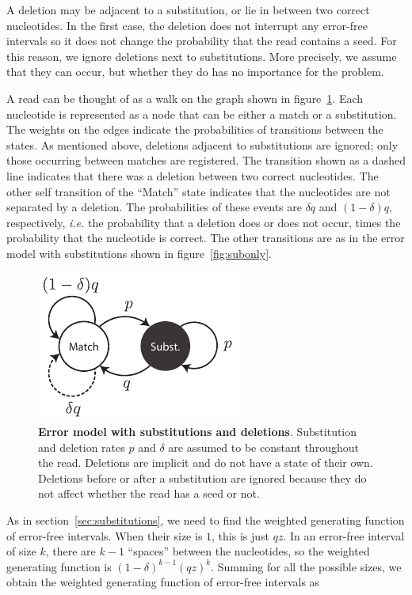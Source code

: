 \documentclass{article}
\begin{document}
A deletion may be adjacent to a substitution, or lie in between two
correct nucleotides. In the first case, the deletion does not interrupt
any error-free intervals so it does not change the probability that the
read contains a seed. For this reason, we ignore deletions next to
substitutions. More precisely, we assume that they can occur, but whether
they do has no importance for the problem.

A read can be thought of as a walk on the graph shown in
figure~\ref{fig:deletions}. Each nucleotide is represented as a node that
can be either a match or a substitution. The weights on the edges indicate
the probabilities of transitions between the states. As mentioned above,
deletions adjacent to substitutions are ignored; only those occurring
between matches are registered. The transition shown as a dashed line
indicates that there was a deletion between two correct nucleotides.
The other self transition of the ``Match'' state indicates that the
nucleotides are not separated by a deletion. The probabilities of these
events are $\delta q$ and $(1-\delta)q$, respectively, \textit{i.e.} the
probability that a deletion does or does not occur, times the probability
that the nucleotide is correct. The other transitions are as in the error
model with substitutions shown in
figure~\ref{fig:subonly}.

\begin{figure}[h]
\centering
\includegraphics[scale=0.9]{deletions.pdf}
\caption{\textbf{Error model with substitutions and deletions}. 
Substitution and deletion rates $p$ and $\delta$ are assumed to be
constant throughout the read. Deletions are implicit and do not have a
state of their own. Deletions before or after a substitution are ignored
because they do not affect whether the read has a seed or not.}
\label{fig:deletions}
\end{figure}

As in section~\ref{sec:substitutions}, we need to find the weighted
generating function of error-free intervals. When their size is $1$, this
is just $qz$. In an error-free interval of size $k$, there are $k-1$
``spaces'' between the nucleotides, so the weighted generating function is
$(1-\delta)^{k-1}(qz)^k$. Summing for all the possible sizes, we obtain
the weighted generating function of error-free intervals as
\end{document}
